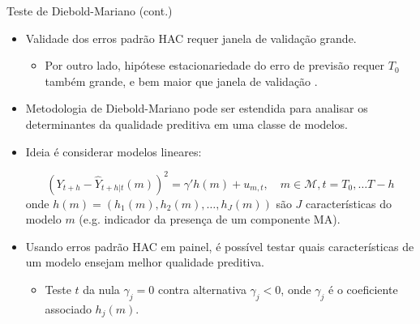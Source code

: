 \documentclass[11pt]{beamer}
\begin{document}
\begin{frame}{Teste de Diebold-Mariano (cont.)}
	\begin{itemize}
		\item Validade dos erros padrão HAC requer janela de validação grande.
		\begin{itemize}
			\item Por outro lado, hipótese estacionariedade do erro de previsão requer  $T_0$ também grande, e bem maior que janela de validação \citep{Diebold2015}.
		\end{itemize}
		\item Metodologia de Diebold-Mariano pode ser estendida para analisar os determinantes da qualidade preditiva em uma classe de modelos.
		\item Ideia é considerar modelos lineares:
		
		$$(Y_{t+h} - \hat{Y}_{t+h|t}(m))^2 = \gamma'h(m) + u_{m,t}, \quad m \in \mathcal{M}, t = T_0,\ldots T-h$$
		onde $h(m) = (h_1(m), h_2(m),\ldots, h_J(m))$ são $J$ características do modelo $m$ (e.g. indicador da presença de um componente MA).
		\item Usando erros padrão HAC em painel, é possível testar quais características de um modelo ensejam melhor qualidade preditiva.
		\begin{itemize}
			\item Teste $t$ da nula $\gamma_j = 0$ contra alternativa $\gamma_j < 0$, onde $\gamma_j$ é o coeficiente associado $h_j(m)$.
		\end{itemize}
	\end{itemize}
\end{frame}
\end{document}
